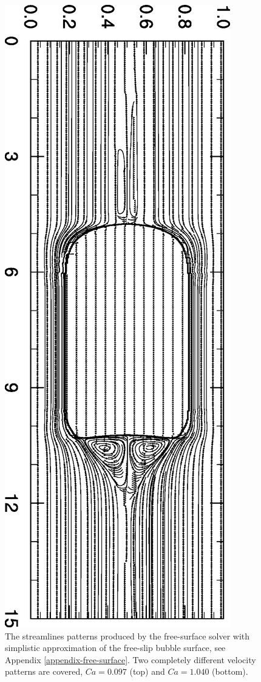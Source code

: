 \documentclass{article}
\begin{document}
\begin{description}
\begin{figure}[htb!]
\includegraphics[angle=90,width=\textwidth]{Figures/performed_ca1040_out.eps}
\caption{The streamlines patterns produced by the free-surface solver with simplistic approximation
of the free-slip bubble surface, see Appendix \ref{appendix-free-surface}. Two completely different
velocity patterns are covered, $Ca=0.097$ (top) and $Ca=1.040$ (bottom).
\label{fig:streamlines:tweaked:velocity}}
\end{figure}


\end{description}
\end{document}
